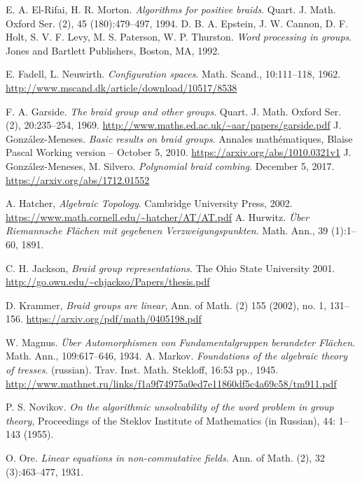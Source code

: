 \documentclass[TFG.tex]{subfiles}
\begin{document}
\begin{thebibliography}{}
E. A. El-Rifai, H. R. Morton. \emph{Algorithms for positive braids}.
Quart. J. Math. Oxford Ser. (2), 45 (180):479–497, 1994.
 D. B. A. Epstein, J. W. Cannon, D. F. Holt, S. V. F. Levy, M. S.
Paterson, W. P. Thurston. \emph{Word processing in groups}. Jones and
Bartlett Publishers, Boston, MA, 1992.

  E. Fadell, L. Neuwirth. \emph{Configuration spaces}. Math. Scand.,
10:111–118, 1962. \url{http://www.mscand.dk/article/download/10517/8538}

 F. A. Garside. \emph{The braid group and other groups}. Quart. J. Math.
Oxford Ser. (2), 20:235–254, 1969. \url{http://www.maths.ed.ac.uk/~aar/papers/garside.pdf}
 J. González-Meneses. \emph{Basic results on braid groups}. Annales mathématiques, Blaise Pascal Working version – October 5, 2010. \url{https://arxiv.org/abs/1010.0321v1}
 J. González-Meneses, M. Silvero. \emph{Polynomial braid combing}. December 5, 2017. \url{https://arxiv.org/abs/1712.01552}

 A. Hatcher, \emph{Algebraic Topology}. Cambridge University Press, 2002. \url{https://www.math.cornell.edu/~hatcher/AT/AT.pdf}
 A. Hurwitz. \emph{Über Riemannsche Flächen mit gegebenen Verzweigungspunkten}.
Math. Ann., 39 (1):1–60, 1891.

 C. H. Jackson, \emph{Braid group representations}. The Ohio State University
2001. \url{http://go.owu.edu/~chjackso/Papers/thesis.pdf}

 D. Krammer, \emph{Braid groups are linear}, Ann. of Math. (2) 155 (2002), no. 1,
131–156. \url{https://arxiv.org/pdf/math/0405198.pdf}

 W. Magnus. \emph{Über Automorphismen von Fundamentalgruppen berandeter
Flächen}. Math. Ann., 109:617–646, 1934.
 A. Markov. \emph{Foundations of the algebraic theory of tresses}. (russian).
Trav. Inst. Math. Stekloff, 16:53 pp., 1945. \url{http://www.mathnet.ru/links/f1a9f74975a0ed7e11860df5c4a69c58/tm911.pdf}

  P. S. Novikov. \emph{On the algorithmic unsolvability of the word problem in group theory}, Proceedings of the Steklov Institute of Mathematics (in Russian), 44: 1–143 (1955). 

 O. Ore. \emph{Linear equations in non-commutative fields}. Ann. of Math.
(2), 32 (3):463–477, 1931.


\end{thebibliography}
\end{document}
